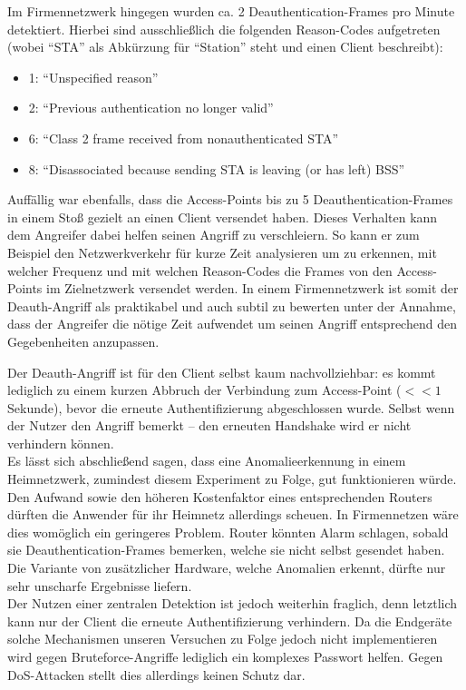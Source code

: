 Im Firmennetzwerk hingegen wurden ca. 2 Deauthentication-Frames pro Minute detektiert.
Hierbei sind ausschließlich die folgenden Reason-Codes aufgetreten (wobei \enquote{STA} als Abkürzung für \enquote{Station} steht und einen Client beschreibt):
\begin{itemize}
	\item 1: \enquote{Unspecified reason}
	\item 2: \enquote{Previous authentication no longer valid}
	\item 6: \enquote{Class 2 frame received from nonauthenticated STA}
	\item 8: \enquote{Disassociated because sending STA is leaving (or has left) BSS}
\end{itemize}
Auffällig war ebenfalls, dass die Access-Points bis zu 5 Deauthentication-Frames in einem Stoß gezielt an einen Client versendet haben.
Dieses Verhalten kann dem Angreifer dabei helfen seinen Angriff zu verschleiern.
So kann er zum Beispiel den Netzwerkverkehr für kurze Zeit analysieren um zu erkennen, mit welcher Frequenz und mit welchen Reason-Codes die Frames von den Access-Points im Zielnetzwerk versendet werden.
In einem Firmennetzwerk ist somit der Deauth-Angriff als praktikabel und auch subtil zu bewerten unter der Annahme, dass der Angreifer die nötige Zeit aufwendet um seinen Angriff entsprechend den Gegebenheiten anzupassen.

Der Deauth-Angriff ist für den Client selbst kaum nachvollziehbar: es kommt lediglich zu einem kurzen Abbruch der Verbindung zum Access-Point ($<< 1$ Sekunde), bevor die erneute Authentifizierung abgeschlossen wurde. Selbst wenn der Nutzer den Angriff bemerkt -- den erneuten Handshake wird er nicht verhindern können.\\

Es lässt sich abschließend sagen, dass eine Anomalieerkennung in einem Heimnetzwerk, zumindest diesem Experiment zu Folge, gut funktionieren würde. Den Aufwand sowie den höheren Kostenfaktor eines entsprechenden Routers dürften die Anwender für ihr Heimnetz allerdings scheuen. In Firmennetzen wäre dies womöglich ein geringeres Problem. Router könnten Alarm schlagen, sobald sie Deauthentication-Frames bemerken, welche sie nicht selbst gesendet haben. Die Variante von zusätzlicher Hardware, welche Anomalien erkennt, dürfte nur sehr unscharfe Ergebnisse liefern.\\

Der Nutzen einer zentralen Detektion ist jedoch weiterhin fraglich, denn letztlich kann nur der Client die erneute Authentifizierung verhindern. Da die Endgeräte solche Mechanismen unseren Versuchen zu Folge jedoch nicht implementieren wird gegen Bruteforce-Angriffe lediglich ein komplexes Passwort helfen. Gegen DoS-Attacken stellt dies allerdings keinen Schutz dar.

